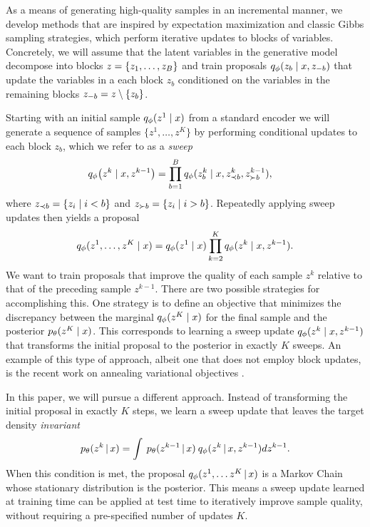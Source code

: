 \documentclass{article}
\theoremstyle{definition}
\begin{document}
As a means of generating high-quality samples in an incremental manner, we develop methods that are inspired by expectation maximization and classic Gibbs sampling strategies, which perform iterative updates to blocks of variables. Concretely, we will assume that the latent variables in the generative model decompose into blocks $z = \{z_1, \ldots, z_B\}$ and train proposals $q_\phi(z_b \mid x, z_{-b})$ that update the variables in a each block $z_{b}$ conditioned on the variables in the remaining blocks $z_{-b} = z \setminus \{z_b\}$.

Starting with an initial sample $q_\phi(z^{1} \mid x)$ from a standard encoder we will generate a sequence of samples $\{z^1, \ldots, z^K\}$ by performing conditional updates to each block $z_b$, which we refer to as a \emph{sweep}
\begin{align}
    \label{eq:approx-gibbs-kernel}
    q_\phi \big( z^k \mid x, z^{k-1} \big)
    &=
    \prod_{b=1}^B
    q_\phi(z^k_b \mid x, z^{k}_{\prec b}, z^{k-1}_{\succ b})
    ,
\end{align}
where $z_{\prec b} = \{z_i \mid i < b\}$ and $z_{\succ b} = \{z_i \mid i > b\}$. Repeatedly applying sweep updates then yields a proposal
\begin{equation*}
    q_\phi(z^1, \ldots, z^K \mid x) 
    =
    q_\phi(z^1 \mid x)
    \prod_{k=2}^K
    q_\phi(z^k \mid x, z^{k-1}).
\end{equation*}
We want to train proposals that improve the quality of each sample $z^k$ relative to that of the preceding sample $z^{k-1}$. There are two possible strategies for accomplishing this. One strategy is to define an objective that minimizes the discrepancy between the marginal $q_\phi(z^K \mid x)$ for the final sample and the posterior $p_\theta(z^K \mid x)$. This corresponds to learning a sweep update $q_\phi(z^k \mid x, z^{k-1})$ that transforms the initial proposal to the posterior in exactly $K$ sweeps. An example of this type of approach, albeit one that does not employ block updates, is the recent work on annealing variational objectives \cite{huang2018improving}.

In this paper, we will pursue a different approach. Instead of transforming the initial proposal in exactly $K$ steps, we learn a sweep update that leaves the target density \emph{invariant}
\begin{equation}
    \label{eq:kernel-invariance}
    p_\theta(z^k \,|\, x) = \int \: p_\theta(z^{k-1} \,|\, x) \: q_\phi(z^k \,|\,x, z^{k-1}) d z^{k-1}.
\end{equation}
When this condition is met, the proposal $q_\phi(z^1, \ldots z^K \,|\, x)$ is a Markov Chain whose stationary distribution is the posterior. 
This means a sweep update learned at training time can be applied at test time to iteratively improve sample quality, without requiring a pre-specified number of updates $K$.
\end{document}
